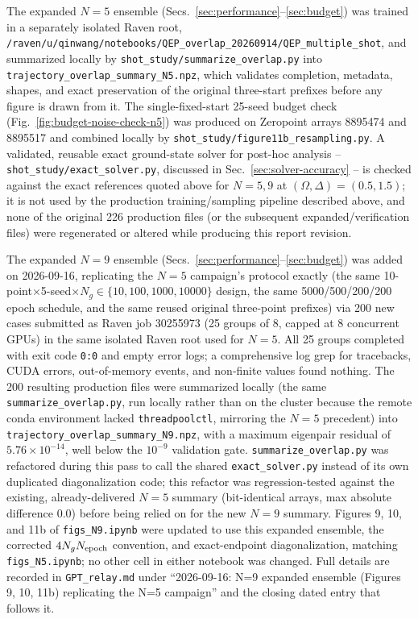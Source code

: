 \documentclass[11pt]{article}
\begin{document}
The expanded $N=5$ ensemble (Secs.~\ref{sec:performance}--\ref{sec:budget}) was trained
in a separately isolated Raven root,
\texttt{/raven/u/qinwang/notebooks/QEP\_overlap\_20260914/QEP\_multiple\_shot}, and
summarized locally by \texttt{shot\_study/summarize\_overlap.py} into
\texttt{trajectory\_overlap\_summary\_N5.npz}, which validates completion, metadata,
shapes, and exact preservation of the original three-start prefixes before any
figure is drawn from it.  The single-fixed-start 25-seed budget check
(Fig.~\ref{fig:budget-noise-check-n5}) was produced on Zeropoint arrays 8895474 and
8895517 and combined locally by \texttt{shot\_study/figure11b\_resampling.py}.  A
validated, reusable exact ground-state solver for post-hoc analysis --
\texttt{shot\_study/exact\_solver.py}, discussed in Sec.~\ref{sec:solver-accuracy} --
is checked against the exact references quoted above for $N=5,9$ at
$(\Omega,\Delta)=(0.5,1.5)$; it is not used by the production training/sampling
pipeline described above, and none of the original 226 production files (or the
subsequent expanded/verification files) were regenerated or altered while producing
this report revision.

The expanded $N=9$ ensemble (Secs.~\ref{sec:performance}--\ref{sec:budget}) was
added on 2026-09-16, replicating the $N=5$ campaign's protocol exactly (the same
10-point$\times$5-seed$\times N_g\in\{10,100,1000,10000\}$ design, the same
5000/500/200/200 epoch schedule, and the same reused original three-point
prefixes) via 200 new cases submitted as Raven job 30255973 (25 groups of 8, capped
at 8 concurrent GPUs) in the same isolated Raven root used for $N=5$.  All 25
groups completed with exit code \texttt{0:0} and empty error logs; a comprehensive
log grep for tracebacks, CUDA errors, out-of-memory events, and non-finite values
found nothing.  The 200 resulting production files were summarized locally (the
same \texttt{summarize\_overlap.py}, run locally rather than on the cluster because
the remote conda environment lacked \texttt{threadpoolctl}, mirroring the $N=5$
precedent) into \texttt{trajectory\_overlap\_summary\_N9.npz}, with a maximum
eigenpair residual of $5.76\times10^{-14}$, well below the $10^{-9}$ validation
gate.  \texttt{summarize\_overlap.py} was refactored during this pass to call the
shared \texttt{exact\_solver.py} instead of its own duplicated diagonalization
code; this refactor was regression-tested against the existing, already-delivered
$N=5$ summary (bit-identical arrays, max absolute difference $0.0$) before being
relied on for the new $N=9$ summary.  Figures 9, 10, and 11b of
\texttt{figs\_N9.ipynb} were updated to use this expanded ensemble, the corrected
$4N_gN_{\rm epoch}$ convention, and exact-endpoint diagonalization, matching
\texttt{figs\_N5.ipynb}; no other cell in either notebook was changed.  Full
details are recorded in \texttt{GPT\_relay.md} under ``2026-09-16: N=9 expanded
ensemble (Figures 9, 10, 11b) replicating the N=5 campaign'' and the closing
dated entry that follows it.
\end{document}
